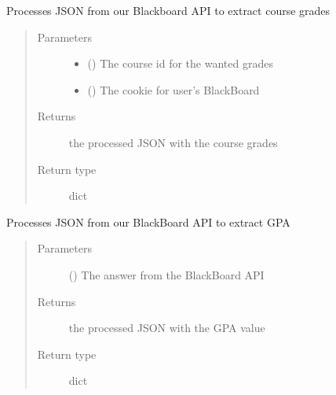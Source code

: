 \documentclass[letterpaper,10pt,english]{sphinxmanual}
\begin{document}
\begin{fulllineitems}
\label{\detokenize{DialogFlow_Bridge_API:DialogFlow_Bridge_API.getCourseGradeResult}}
\pysigstartsignatures
{}
\pysigstopsignatures
\sphinxAtStartPar
Processes JSON from our Blackboard API to extract course grades
\begin{quote}\begin{description}
\item[{Parameters}] \leavevmode\begin{itemize}
\item {} 
\sphinxAtStartPar
{} () \textendash{} The course id for the wanted grades

\item {} 
\sphinxAtStartPar
{} () \textendash{} The cookie for user’s BlackBoard

\end{itemize}

\item[{Returns}] \leavevmode
\sphinxAtStartPar
the processed JSON with the course grades

\item[{Return type}] \leavevmode
\sphinxAtStartPar
dict

\end{description}\end{quote}

\end{fulllineitems}


\begin{fulllineitems}
\label{\detokenize{DialogFlow_Bridge_API:DialogFlow_Bridge_API.getGPA}}
\pysigstartsignatures
{}
\pysigstopsignatures
\sphinxAtStartPar
Processes JSON from our BlackBoard API to extract GPA
\begin{quote}\begin{description}
\item[{Parameters}] \leavevmode
\sphinxAtStartPar
{} () \textendash{} The answer from the BlackBoard API

\item[{Returns}] \leavevmode
\sphinxAtStartPar
the processed JSON with the GPA value

\item[{Return type}] \leavevmode
\sphinxAtStartPar
dict

\end{description}\end{quote}

\end{fulllineitems}
\end{document}
